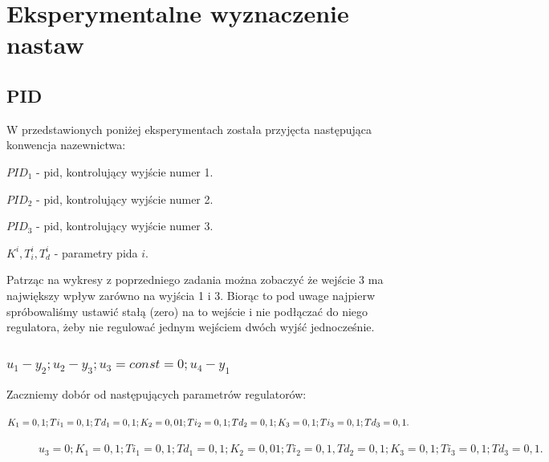 \chapter{Eksperymentalne wyznaczenie nastaw}

\section{PID}
W przedstawionych poniżej eksperymentach została przyjęcta następująca konwencja nazewnictwa:

$PID_1$ - pid, kontrolujący wyjście numer 1.

\smallskip

$PID_2$ - pid, kontrolujący wyjście numer 2.

\smallskip

$PID_3$ - pid, kontrolujący wyjście numer 3.

\smallskip

$K^i, T_i^i, T_d^i$ - parametry pida $i$.

\smallskip

Patrząc na wykresy z poprzedniego zadania można zobaczyć że wejście 3 ma największy wpływ zarówno na wyjścia 1 i 3. Biorąc to pod uwage najpierw spróbowaliśmy ustawić stałą (zero) na to wejście i nie podłączać do niego regulatora, żeby nie regulować jednym wejściem dwóch wyjść jednocześnie.

\subsection{$u_1 - y_2; u_2 - y_3; u_3 = const = 0; u_4 - y_1$}


Zaczniemy dobór od następujących parametrów regulatorów:

\begin{math}
K_1 = 0,1;\\
    Ti_1 = 0,1;\\
    Td_1 = 0,1;\\
    K_2 = 0,01;\\
    Ti_2 = 0,1;\\
    Td_2 = 0,1;\\
    K_3 = 0,1;\\
    Ti_3 = 0,1;\\
    Td_3 = 0,1.
\end{math}

\begin{figure}[H]
    \centering
    
    \caption{$u_3 = 0; K_1 = 0,1; Ti_1 = 0,1; Td_1 = 0,1; K_2 = 0,01; Ti_2 = 0,1, Td_2 = 0,1; K_3 = 0,1; Ti_3 = 0,1; Td_3 = 0,1.$}
\end{figure}


